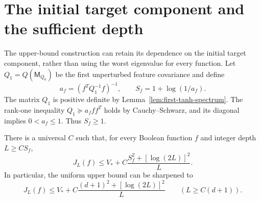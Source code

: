 \section{The initial target component and the sufficient depth}
\label{sec:critical-target-seed}

The upper-bound construction can retain its dependence on the initial
target component, rather than using the worst eigenvalue for every
function. Let $Q_1=Q(\mathsf M_{Q_0})$ be the first unperturbed feature
covariance and define
\[
 a_f=(f^TQ_1^{-1}f)^{-1},\qquad S_f=1+\log(1/a_f).
\]
The matrix $Q_1$ is positive definite by
Lemma~\ref{lem:first-tanh-spectrum}. The rank-one inequality
$Q_1\succeq a_f ff^T$ holds by Cauchy--Schwarz, and its diagonal
implies $0<a_f\le1$. Thus $S_f\ge1$.

\begin{theorem}
\label{thm:critical-target-seed-upper}
There is a universal $C$ such that, for every Boolean function $f$ and
integer depth $L\ge CS_f$,
\[
 J_L(f)\le V_*+C\frac{S_f^2+[\log(2L)]^2}{L}.
\]
In particular, the uniform upper bound can be sharpened to
\[
 J_L(f)\le V_*+C\frac{(d+1)^2+[\log(2L)]^2}{L}
 \qquad(L\ge C(d+1)).
\]
\end{theorem}

